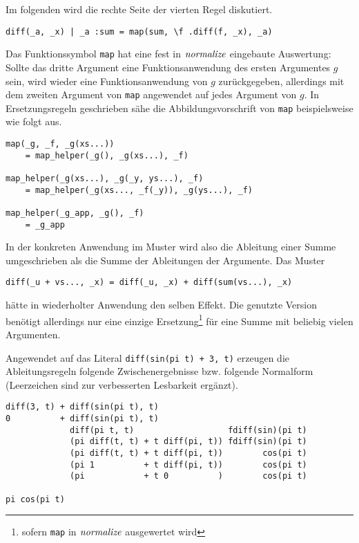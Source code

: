Im folgenden wird die rechte Seite der vierten Regel diskutiert.
\begin{verbatim}
diff(_a, _x) | _a :sum = map(sum, \f .diff(f, _x), _a)
\end{verbatim}
Das Funktionssymbol \verb|map| hat eine fest in $\mathit{normalize}$ eingebaute Auswertung: Sollte das dritte Argument eine Funktionsanwendung des ersten Argumentes $g$ sein, wird wieder eine Funktionsanwendung von $g$ zurückgegeben, allerdings mit dem zweiten Argument von \verb|map| angewendet auf jedes Argument von $g$. In Ersetzungsregeln geschrieben sähe die Abbildungsvorschrift von \verb|map| beispielsweise wie folgt aus.
\begin{unbreakable}\begin{verbatim}
map(_g, _f, _g(xs...)) 
    = map_helper(_g(), _g(xs...), _f)

map_helper(_g(xs...), _g(_y, ys...), _f) 
    = map_helper(_g(xs..., _f(_y)), _g(ys...), _f)

map_helper(_g_app, _g(), _f) 
    = _g_app
\end{verbatim}\end{unbreakable}

In der konkreten Anwendung im Muster wird also die Ableitung einer Summe umgeschrieben als die Summe der Ableitungen der Argumente. Das Muster
\begin{verbatim}
diff(_u + vs..., _x) = diff(_u, _x) + diff(sum(vs...), _x)
\end{verbatim}
hätte in wiederholter Anwendung den selben Effekt. Die genutzte Version benötigt allerdings nur eine einzige Ersetzung\footnote{sofern \texttt{map} in $\mathit{normalize}$ ausgewertet wird} für eine Summe mit beliebig vielen Argumenten.

\begin{beispiel}
Angewendet auf das Literal \verb|diff(sin(pi t) + 3, t)| erzeugen die Ableitungsregeln folgende Zwischenergebnisse bzw. folgende Normalform (Leerzeichen sind zur verbesserten Lesbarkeit ergänzt).
\begin{unbreakable}\begin{verbatim}
diff(3, t) + diff(sin(pi t), t)
0          + diff(sin(pi t), t)
             diff(pi t, t)                   fdiff(sin)(pi t)
             (pi diff(t, t) + t diff(pi, t)) fdiff(sin)(pi t)
             (pi diff(t, t) + t diff(pi, t))        cos(pi t)
             (pi 1          + t diff(pi, t))        cos(pi t)
             (pi            + t 0          )        cos(pi t)
             
pi cos(pi t)
\end{verbatim}\end{unbreakable}
\end{beispiel}

